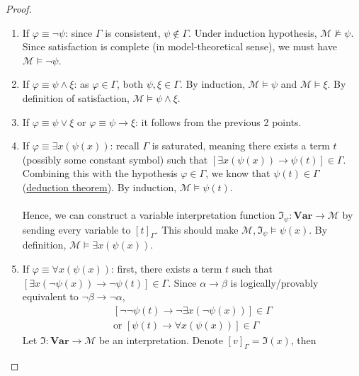 \documentclass{treatise}
\begin{document}
\begin{shaded}
\begin{proof}
\begin{enumerate}
    \item If $\varphi \equiv \neg \psi$: since $\Gamma$ is consistent, $\psi \notin \Gamma$. Under induction hypothesis, $\mathcal{M} \not\vDash \psi$. Since satisfaction is complete (in model-theoretical sense), we must have $\mathcal{M} \vDash \neg \psi$.
    \item If $\varphi \equiv \psi \wedge \xi$: as $\varphi \in \Gamma$, both $\psi, \xi \in \Gamma$. By induction, $\mathcal{M} \vDash \psi$ and $\mathcal{M} \vDash \xi$. By definition of satisfaction, $\mathcal{M} \vDash \psi \wedge \xi$.
    \item If $\varphi \equiv \psi \vee \xi$ or $\varphi \equiv \psi \to \xi$: it follows from the previous 2 points.
    \item If $\varphi \equiv \exists x (\psi(x))$: recall $\Gamma$ is saturated, meaning there exists a term $t$ (possibly some constant symbol) such that $\left[ \exists x (\psi(x)) \to \psi(t) \right] \in \Gamma$. Combining this with the hypothesis $\varphi \in \Gamma$, we know that $\psi(t) \in \Gamma$ (\hyperref[logic-deduct-metathm]{deduction theorem}). By induction, $\mathcal{M} \vDash \psi(t)$.
    \\
    \\
    Hence, we can construct a variable interpretation function $\mathfrak{I}_\psi : \mathbf{Var} \to \mathcal{M}$ by sending every variable to $[t]_\Gamma$. This should make $\mathcal{M}, \mathfrak{I}_\psi \vDash \psi(x)$. By definition, $\mathcal{M} \vDash \exists x (\psi(x))$.
    \item If $\varphi \equiv \forall x (\psi(x))$: first, there exists a term $t$ such that $\left[ \exists x \left( \neg \psi(x) \right) \to \neg \psi(t) \right] \in \Gamma$. Since $\alpha \to \beta$ is logically/provably equivalent to $\neg \beta \to \neg \alpha$,
    \begin{align*}
        \left[ \neg \neg \psi(t) \to \neg \exists x \left( \neg \psi(x) \right) \right] \in \Gamma
        \\
        \mbox{or } \left[ \psi(t) \to \forall x \left( \psi(x) \right) \right] \in \Gamma
    \end{align*}
    Let $\mathfrak{I}: \mathbf{Var} \to \mathcal{M}$ be an interpretation. Denote $[v]_\Gamma = \mathfrak{I}(x)$, then 
\end{enumerate}
\end{proof}


\end{shaded}
\end{document}
